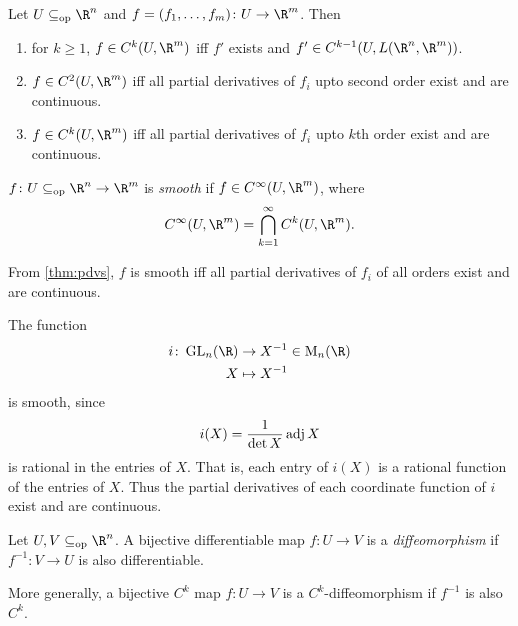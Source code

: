 \begin{theorem} \label{thm:pdvs}
    Let $U \subopeneq \R^n$ and $f = (f_1, \dots, f_m)\colon U \to \R^m$.
    Then
    \begin{enumerate}
        \item for $k \ge 1$, $f \in C^k(U, \R^m)$ iff $f'$ exists and
        $f' \in C^{k-1}(U, L(\R^n, \R^m))$.
        \item $f \in C^2(U, \R^m)$ iff all partial derivatives of $f_i$
        upto second order exist and are continuous.
        \item $f \in C^k(U, \R^m)$ iff all partial derivatives of $f_i$
        upto $k$th order exist and are continuous.
    \end{enumerate}
\end{theorem}

\begin{definition*}[smoothness] \label{def:smooth}
    $f\colon U \subopeneq \R^n \to \R^m$ is \emph{smooth} if
    $f \in C^\infty(U, \R^m)$, where \[
        C^\infty(U, \R^m) = \bigcap_{k=1}^\infty C^k(U, \R^m).
    \]
\end{definition*}

\begin{corollary}
    From \cref{thm:pdvs}, $f$ is smooth iff all partial derivatives of $f_i$
    of all orders exist and are continuous.
\end{corollary}

\begin{example}
    The function \begin{align*}
        i\colon \GL_n(\R) &\to X^{-1} \in \M_n(\R) \\
        X &\mapsto X^{-1}
    \end{align*}
    is smooth, since \[
        i(X) = \frac{1}{\det X} \operatorname{adj} X
    \] is rational in the entries of $X$.
    That is, each entry of $i(X)$ is a rational function of the entries of
    $X$.
    Thus the partial derivatives of each coordinate function of $i$ exist
    and are continuous.
\end{example}

\begin{definition*}[diffeomorphism] \label{def:diffeo}
    Let $U, V \subopeneq \R^n$.
    A bijective differentiable map $f\colon U \to V$ is a
    \emph{diffeomorphism} if $f^{-1}\colon V \to U$ is also differentiable.

    More generally, a bijective $C^k$ map $f\colon U \to V$ is a
    $C^k$-diffeomorphism if $f^{-1}$ is also $C^k$.
\end{definition*}

